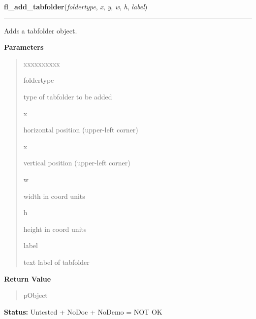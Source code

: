 \hspace{.8\funcindent}\begin{boxedminipage}{\funcwidth}

    \raggedright \textbf{fl\_add\_tabfolder}(\textit{foldertype}, \textit{x}, \textit{y}, \textit{w}, \textit{h}, \textit{label})

    \vspace{-1.5ex}

    \rule{\textwidth}{0.5\fboxrule}
\setlength{\parskip}{2ex}
    Adds a tabfolder object.

\setlength{\parskip}{1ex}
      \textbf{Parameters}
      \vspace{-1ex}

      \begin{quote}
        \begin{Ventry}{xxxxxxxxxx}

          \item[foldertype]

          type of tabfolder to be added

          \item[x]

          horizontal position (upper-left corner)

          \item[x]

          vertical position (upper-left corner)

          \item[w]

          width in coord units

          \item[h]

          height in coord units

          \item[label]

          text label of tabfolder

        \end{Ventry}

      \end{quote}

      \textbf{Return Value}
    \vspace{-1ex}

      \begin{quote}
      pObject

      \end{quote}

\textbf{Status:} Untested + NoDoc + NoDemo = NOT OK



    \end{boxedminipage}

